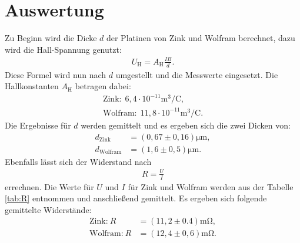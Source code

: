 \section{Auswertung}
\label{sec:Auswertung}
Zu Beginn wird die Dicke $d$ der Platinen von Zink und Wolfram
berechnet, dazu wird die Hall-Spannung genutzt:
\begin{align}
U_\mathrm{H}=A_\mathrm{H}\frac{IB}{d}.
\end{align}
Diese Formel wird nun nach $d$ umgestellt und die Messwerte eingesetzt.
Die Hallkonstanten $A_\mathrm{H}$ betragen dabei:
\begin{align*}
  \text{Zink:}\ \ 6,4\cdot10^{-11}\si{\meter\tothe{3}\per\coulomb},\\
  \text{Wolfram:}\ \ 11,8\cdot10^{-11}\si{\meter\tothe{3}\per\coulomb}.
  \end{align*}
Die Ergebnisse für $d$ werden gemittelt und es ergeben sich die zwei Dicken von:
\begin{align*}
d_\mathrm{Zink}&=(0,67\pm0,16)\si{\micro\meter},\\
d_\mathrm{Wolfram}&=(1,6\pm0,5)\si{\micro\meter}.
\end{align*}
Ebenfalls lässt sich
der Widerstand nach
\begin{align}
  R=\frac{U}{I}
\end{align}
errechnen.
Die Werte für $U$ und $I$ für Zink und Wolfram werden aus der Tabelle \ref{tab:R} entnommen und anschließend gemittelt.
Es ergeben sich folgende gemittelte Widerstände:
\begin{align*}
\text{Zink:} \ R&=(11,2\pm0.4)\si{\milli\ohm},\\
\text{Wolfram:} \ R&=(12,4\pm0,6)\si{\milli\ohm}.
\end{align*}
